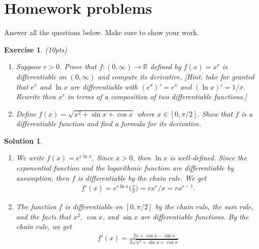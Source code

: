 \documentclass[12pt]{article}
\newcommand{\bR}{\mathbb{R}}
\newcommand{\ra}{\rightarrow}
\theoremstyle{plain}
\newtheorem{exer}{\textbf{Exercise}}}
\theoremstyle{plain}
\newtheorem*{sol}{\textbf{Solution}}}
\theoremstyle{plain}
\theoremstyle{plain}
\begin{document}
\section{Homework problems}
Answer all the questions below. Make sure to show your work.

\begin{exer}
(10pts)
\begin{enumerate}[label=\textbf{\alph*)}]
\item Suppose $r > 0$. Prove that $f : (0, \infty ) \ra \bR$ defined by $f(x) = x^r$ is differentiable on $(0, \infty )$ and compute its derivative. [Hint: take for granted that $e^x$ and $\ln x$ are differentiable with $(e^x)' = e^x$ and $(\ln x)' = 1/x$. Rewrite then $x^r$ in terms of a composition of two differentiable functions.]
\item Define $f(x) = \sqrt{x^2 + \sin x + \cos x}$ where $x \in [0, \pi/2 ]$. Show that $f$ is a differentiable function and find a formula for its derivative.
\end{enumerate}
\end{exer}
\begin{sol}
\begin{enumerate}[label=\textbf{\alph*)}]
\item We write $f(x) = e^{r\ln x}$. Since $x > 0$, then $\ln x$ is well-defined. Since the exponential function and the logarithmic function are differentiable by assumption, then $f$ is differentiable by the chain rule. We get
	\begin{align*}
	f'(x) = e^{r\ln x} \Big( \frac{r}{x} \Big) = rx^r/x = rx^{r-1} .
	\end{align*}
\item The function $f$ is differentiable on $[0, \pi/2]$ by the chain rule, the sum rule, and the facts that $x^2$, $\cos x$, and $\sin x$ are differentiable functions. By the chain rule, we get
	\begin{align*}
	f'(x) = \frac{2x + \cos x - \sin x}{2 \sqrt{x^2 + \sin x + \cos x}}
	\end{align*}
\end{enumerate}
\end{sol}
\end{document}
